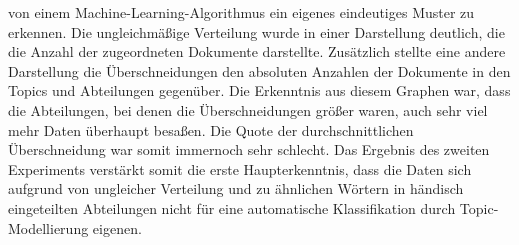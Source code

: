 \documentclass[german,version-2020-11]{uzl-thesis}
\begin{document}
von einem Machine-Learning-Algorithmus ein eigenes eindeutiges Muster zu erkennen. Die ungleichmäßige Verteilung wurde in einer Darstellung deutlich, die die Anzahl der zugeordneten Dokumente darstellte. Zusätzlich stellte eine andere Darstellung die Überschneidungen den absoluten Anzahlen der Dokumente in den Topics und Abteilungen gegenüber. Die Erkenntnis aus diesem Graphen war, dass die Abteilungen, bei denen die Überschneidungen größer waren, auch sehr viel mehr Daten überhaupt besaßen. Die Quote der durchschnittlichen Überschneidung war somit immernoch sehr schlecht. Das Ergebnis des zweiten Experiments verstärkt somit die erste Haupterkenntnis, dass die Daten sich aufgrund von ungleicher Verteilung und zu ähnlichen Wörtern in händisch eingeteilten Abteilungen nicht für eine automatische Klassifikation durch Topic-Modellierung eigenen.

%






%
\end{document}
